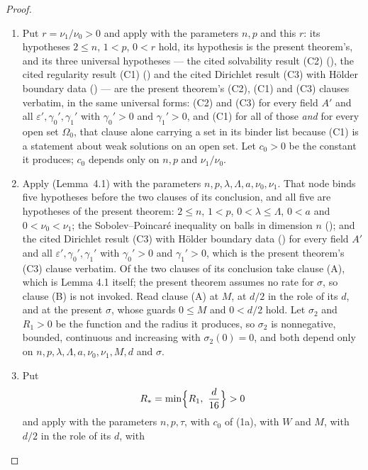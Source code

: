 \begin{proof}
\begin{enumerate}
\item[(1a)] Put $r=\nu_1/\nu_0>0$ and apply 
  with the parameters $n,p$ and this $r$: its hypotheses $2\le n$, $1<p$,
  $0<r$ hold, its hypothesis  is the present
  theorem's, and its three universal hypotheses --- the cited solvability
  result (C2) (), the cited regularity result (C1)
  () and the cited Dirichlet result (C3) with
  H\"older boundary data () --- are the present
  theorem's (C2), (C1) and (C3) clauses verbatim, in the same universal forms:
  (C2) and (C3) for every field $A'$ and all $\varepsilon',\gamma_0',\gamma_1'$
  with $\gamma_0'>0$ and $\gamma_1'>0$, and (C1) for all of those \emph{and} for
  every open set $\Omega_0$, that clause alone carrying a set in its binder list
  because (C1) is a statement about weak solutions on an open set.  Let $c_0>0$ be the constant
  it produces; $c_0$ depends only on $n,p$ and $\nu_1/\nu_0$.
\item[(1b)] Apply  (Lemma~4.1) with the
  parameters $n,p,\lambda,\Lambda,a,\nu_0,\nu_1$.  That node binds five
  hypotheses before the two clauses of its conclusion, and all five are
  hypotheses of the present theorem: $2\le n$, $1<p$,
  $0<\lambda\le\Lambda$, $0<a$ and $0<\nu_0<\nu_1$; the Sobolev--Poincar\'e
  inequality on balls in dimension $n$ ();
  and the cited Dirichlet result (C3) with H\"older boundary data
  () for every field $A'$ and all
  $\varepsilon',\gamma_0',\gamma_1'$ with $\gamma_0'>0$ and $\gamma_1'>0$,
  which is the present theorem's (C3) clause verbatim.  Of the two
  clauses of its conclusion take clause (A), which is Lemma 4.1 itself; the
  present theorem assumes no rate for $\sigma$, so clause (B) is not invoked.
  Read clause (A) at $M$, at $d/2$ in the role of its $d$, and at the present
  $\sigma$, whose guards $0\le M$ and $0<d/2$ hold.  Let $\sigma_2$ and
  $R_1>0$ be the function and the radius it produces, so $\sigma_2$ is
  nonnegative, bounded, continuous and increasing with $\sigma_2(0)=0$, and
  both depend only on $n,p,\lambda,\Lambda,a,\nu_0,\nu_1,M,d$ and $\sigma$.
\item[(1c)] Put
  \[
  R_\ast=\min\Bigl\{R_1,\ \frac d{16}\Bigr\}>0
  \]
  and apply  with the parameters $n,p,\tau$,
  with $c_0$ of (1a), with $W$ and $M$, with $d/2$ in the role of its $d$, with

\end{enumerate}
\end{proof}
